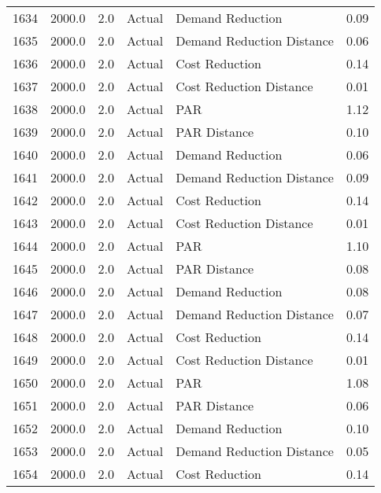 \begin{longtable}{lrrllr}
1634 &       2000.0 &     2.0 &         Actual &           Demand Reduction &   0.09 \\
1635 &       2000.0 &     2.0 &         Actual &  Demand Reduction Distance &   0.06 \\
1636 &       2000.0 &     2.0 &         Actual &             Cost Reduction &   0.14 \\
1637 &       2000.0 &     2.0 &         Actual &    Cost Reduction Distance &   0.01 \\
1638 &       2000.0 &     2.0 &         Actual &                        PAR &   1.12 \\
1639 &       2000.0 &     2.0 &         Actual &               PAR Distance &   0.10 \\
1640 &       2000.0 &     2.0 &         Actual &           Demand Reduction &   0.06 \\
1641 &       2000.0 &     2.0 &         Actual &  Demand Reduction Distance &   0.09 \\
1642 &       2000.0 &     2.0 &         Actual &             Cost Reduction &   0.14 \\
1643 &       2000.0 &     2.0 &         Actual &    Cost Reduction Distance &   0.01 \\
1644 &       2000.0 &     2.0 &         Actual &                        PAR &   1.10 \\
1645 &       2000.0 &     2.0 &         Actual &               PAR Distance &   0.08 \\
1646 &       2000.0 &     2.0 &         Actual &           Demand Reduction &   0.08 \\
1647 &       2000.0 &     2.0 &         Actual &  Demand Reduction Distance &   0.07 \\
1648 &       2000.0 &     2.0 &         Actual &             Cost Reduction &   0.14 \\
1649 &       2000.0 &     2.0 &         Actual &    Cost Reduction Distance &   0.01 \\
1650 &       2000.0 &     2.0 &         Actual &                        PAR &   1.08 \\
1651 &       2000.0 &     2.0 &         Actual &               PAR Distance &   0.06 \\
1652 &       2000.0 &     2.0 &         Actual &           Demand Reduction &   0.10 \\
1653 &       2000.0 &     2.0 &         Actual &  Demand Reduction Distance &   0.05 \\
1654 &       2000.0 &     2.0 &         Actual &             Cost Reduction &   0.14 \\

\end{longtable}
